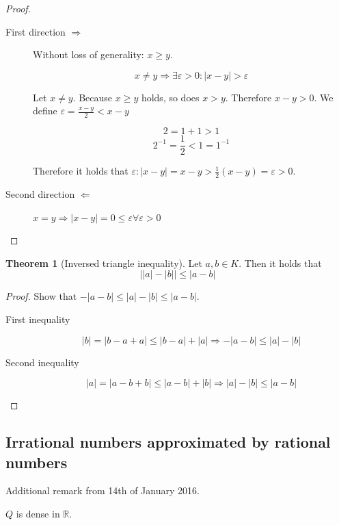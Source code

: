 \documentclass[a4paper,landscape,twocolumn]{article}
\theoremstyle{definition}
\newtheorem{theorem}{Theorem}
\newcommand\abs[1]{\left|#1\right|}
\begin{document}
\begin{proof}
  \begin{description}
    \item[First direction $\Rightarrow$]
      Without loss of generality: $x \geq y$.

      \[ x \neq y \Rightarrow \exists \varepsilon > 0: \abs{x - y} > \varepsilon \]

      Let $x \neq y$. Because $x \geq y$ holds, so does $x > y$. Therefore $x - y > 0$.
      We define $\varepsilon = \frac{x-y}{2} < x - y$

      \[ 2 = 1 + 1 > 1 \]
      \[ 2^{-1} = \frac12 < 1 = 1^{-1} \]

      Therefore it holds that $\varepsilon: \abs{x-y} = x - y > \frac12(x - y) = \varepsilon > 0$.

    \item[Second direction $\Leftarrow$]
      $x = y \Rightarrow \abs{x-y} = 0 \leq \varepsilon \forall \varepsilon > 0$
  \end{description}
\end{proof}

\begin{theorem}[Inversed triangle inequality]
  Let $a, b \in K$. Then it holds that
  \[ \abs{\abs{a} - \abs{b}} \leq \abs{a - b} \]
\end{theorem}

\begin{proof}
  Show that $-\abs{a - b} \leq \abs{a} - \abs{b} \leq \abs{a - b}$.
  \begin{description}
    \item[First inequality]
      \[ \abs{b} = \abs{b - a + a} \leq \abs{b - a} + \abs{a} \Rightarrow -\abs{a - b} \leq \abs{a} - \abs{b} \]
    \item[Second inequality]
      \[ \abs{a} = \abs{a - b + b} \leq \abs{a - b} + \abs{b} \Rightarrow \abs{a} - \abs{b} \leq \abs{a - b} \]
  \end{description}
\end{proof}

\subsection{Irrational numbers approximated by rational numbers}
%
Additional remark from 14th of January 2016.

$Q$ is dense in $\mathbb R$.
\end{document}
